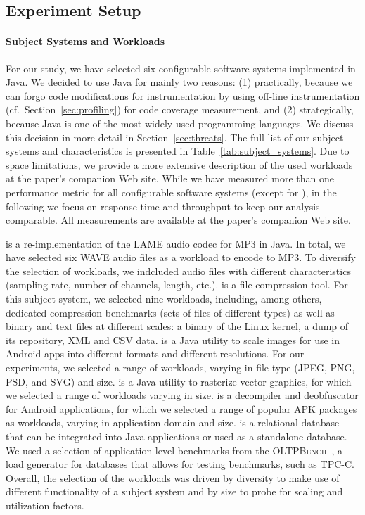 \subsection{Experiment Setup}\label{sec:setup}
\paragraph*{Subject Systems and Workloads}
For our study, we have selected six configurable software systems implemented in Java. We decided to use Java for mainly two reasons: (1) practically, because we can forgo code modifications for instrumentation by using off-line instrumentation (cf.~Section~\ref{sec:profiling}) for code coverage measurement, and (2) strategically, because Java is one of the most widely used programming languages. We discuss this decision in more detail in Section~\ref{sec:threats}. 
The full list of our subject systems and characteristics is presented in Table~\ref{tab:subject_systems}. Due to space limitations, we provide a more extensive description of the used workloads at the paper's companion Web site. While we have measured more than one performance metric for all configurable software systems (except for \htwo), in the following we focus on response time and throughput to keep our analysis comparable. All measurements are available at the paper's companion Web site.
	
\jumper is a re-implementation of the LAME audio codec for MP3 in Java. In total, we have selected six WAVE audio files as a workload to encode to MP3. To diversify the selection of workloads, we indcluded audio files with different characteristics (sampling rate, number of channels, length, etc.). 
\kanzi is a file compression tool. For this subject system, we selected nine workloads, including, among others, dedicated compression benchmarks (sets of files of different types) as well as binary and text files at different scales: a binary of the Linux kernel, a dump of its repository, XML and CSV data. 
\dconvert is a Java utility to scale images for use in Android apps into different formats and different resolutions. For our experiments, we selected a range of workloads, varying in file type (JPEG, PNG, PSD, and SVG) and size.
\batik is a Java utility to rasterize vector graphics, for which we selected a range of workloads varying in size.
\jadx is a decompiler and deobfuscator for Android applications, for which we selected a range of popular APK packages as workloads, varying in application domain and size.
\htwo is a relational database that can be integrated into Java applications or used as a standalone database. We used a selection of application-level benchmarks from the \textsc{OLTPBench}~\cite{difallah_oltp_2013}, a load generator for databases that allows for testing benchmarks, such as \textsc{TPC-C}. Overall, the selection of the workloads was driven by diversity to make use of different functionality of a subject system and by size to probe for scaling and utilization factors.
	
